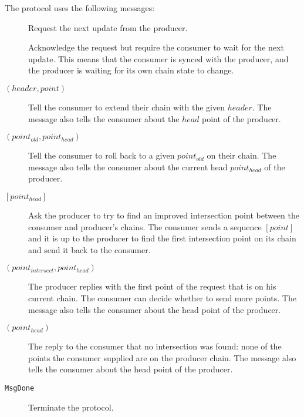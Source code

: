 \documentclass{report}
\newcommand{\msg}[1]{\texttt{#1}}
\newcommand{\MsgDone}{\msg{MsgDone}}
\renewcommand{\langle}{[}
\renewcommand{\rangle}{]}
\theoremstyle{definition}{
  \newtheorem{lemma}{Lemma}[section] %
  \newtheorem{definition}[lemma]{Definition}
}
\theoremstyle{theorem}{
  \newtheorem{invariant}[lemma]{Invariant}
  \newtheorem{proofobligation}[lemma]{Proof Obligation}
}
\numberwithin{equation}{lemma}
\begin{document}
The protocol uses the following messages:
\begin{description}
\item [\RequestNext]
      Request the next update from the producer.
\item [\AwaitReply]
      Acknowledge the request but require the consumer to wait for the next update.
      This means that the consumer is synced with the producer, and
      the producer is waiting for its own chain state to change.
\item [\RollForward{} {\boldmath $(header,point)$}]
      Tell the consumer to extend their chain with the given $header$.
      The message also tells the consumer about the $head$ point of the producer.
\item [\RollBackward{} {\boldmath $(point_{old},point_{head})$}]
      Tell the consumer to roll back to a given $point_{old}$ on their chain.
      The message also tells the consumer about the current head $point_{head}$ of the producer.
\item [\FindIntersect{} {\boldmath $\langle point_{head} \rangle $}]
      Ask the producer to try to find an improved intersection point between
      the consumer and producer's chains.
      The consumer sends a sequence {\boldmath $\langle point \rangle $}
      and it is up to the producer
      to find the first intersection point on its chain and send it back to the consumer.
\item [\IntersectFound{} {\boldmath $(point_{intersect},point_{head})$}]
      The producer replies with the first point of the request that is on his current chain.
      The consumer can decide whether to send more points.
      The message also tells the consumer about the head point of the producer.
\item [\IntersectNotFound{} {\boldmath $(point_{head})$}]
      The reply to the consumer that no intersection was found: none of the
      points the consumer supplied are on the producer chain.
      The message also tells the consumer about the head point of the producer.
\item [\MsgDone]
      Terminate the protocol.
\end{description}
\end{document}
